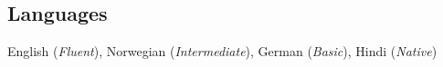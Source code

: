 \documentclass[11pt, a4paper]{article}
\newcommand{\TablePad}{\vspace{-0.4cm}}
\begin{document}
\fi

\subsection*{Languages}
English (\textit{Fluent}), Norwegian (\textit{Intermediate}), German (\textit{Basic}), Hindi (\textit{Native})
\end{document}
